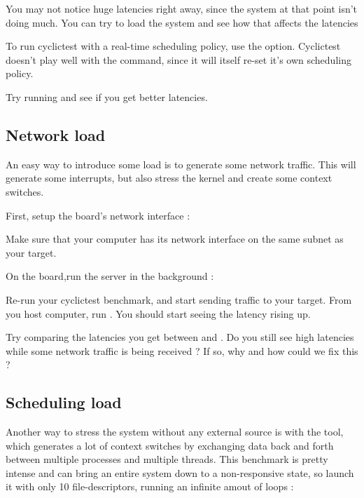 You may not notice huge latencies right away, since the system at that point isn't
doing much. You can try to load the system and see how that affects the latencies

To run cyclictest with a real-time scheduling policy, use the  option.
Cyclictest doesn't play well with the  command, since it will itself re-set
it's own scheduling policy.

Try running  and see if you get better latencies.

\subsection{Network load}

An easy way to introduce some load is to generate some network traffic. This will
generate some interrupts, but also stress the kernel and create some context switches.

First, setup the board's network interface :



Make sure that your computer has its network interface on the same subnet as your
target.

On the board,run the  server in the background :


Re-run your cyclictest benchmark, and start sending traffic to your target. From
you host computer, run . You should start
seeing the latency rising up.

Try comparing the latencies you get between  and . Do you
still see high latencies while some network traffic is being received ? If so, why and how
could we fix this ?

\subsection{Scheduling load}

Another way to stress the system without any external source is with the 
tool, which generates a lot of context switches by exchanging data back and forth between
multiple processes and multiple threads. This benchmark is pretty intense and can bring
an entire system down to a non-responsive state, so launch it with only 10 file-descriptors,
running an infinite amout of loops :

